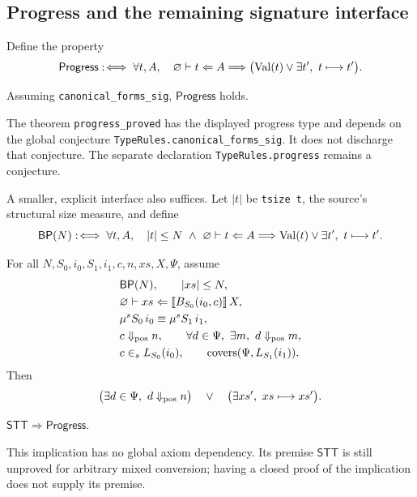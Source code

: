 \subsection{Progress and the remaining signature interface}
Define the property
\[
\mathsf{Progress}:\!\iff\forall t,A,\quad
\varnothing\vdash t\Leftarrow A\Longrightarrow
\bigl(\operatorname{Val}(t)\lor\exists t',\ t\longmapsto t'\bigr).
\]
\begin{theorem}
Assuming \texttt{canonical\_forms\_sig}, $\mathsf{Progress}$ holds.
\end{theorem}
\noindent The theorem \texttt{progress\_proved} has the displayed progress type and depends on the global conjecture \texttt{TypeRules.canonical\_forms\_sig}. It does not discharge that conjecture. The separate declaration \texttt{TypeRules.progress} remains a conjecture.

A smaller, explicit interface also suffices. Let $|t|$ be \texttt{tsize t}, the source's structural size measure, and define
\[
\mathsf{BP}(N):\!\iff\forall t,A,\quad
|t|\le N\ \land\ \varnothing\vdash t\Leftarrow A
\Longrightarrow\operatorname{Val}(t)\lor\exists t',\ t\longmapsto t'.
\]
\begin{definition}
For all $N,S_0,i_0,S_1,i_1,c,n,xs,X,\Psi$, assume
\begin{align*}
&\mathsf{BP}(N),\qquad |xs|\le N,\\
&\varnothing\vdash xs\Leftarrow \llbracket B_{S_0}(i_0,c)\rrbracket\,X,\\
&\mu^s S_0\,i_0\equiv\mu^s S_1\,i_1,\\
&c\Downarrow_{\rm pos}n,\qquad
  \forall d\in\Psi,\ \exists m,\ d\Downarrow_{\rm pos}m,\\
&c\in_s L_{S_0}(i_0),\qquad\operatorname{covers}(\Psi,L_{S_1}(i_1)).
\end{align*}
Then
\[
 \bigl(\exists d\in\Psi,\ d\Downarrow_{\rm pos}n\bigr)
 \quad\lor\quad\bigl(\exists xs',\ xs\longmapsto xs'\bigr).
\]
\end{definition}
\begin{theorem}
$\mathsf{STT}\Longrightarrow\mathsf{Progress}$.
\end{theorem}
\noindent This implication has no global axiom dependency. Its premise $\mathsf{STT}$ is still unproved for arbitrary mixed conversion; having a closed proof of the implication does not supply its premise.

